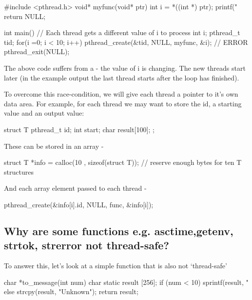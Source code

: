 \begin{code}[language=C]
#include <pthread.h>
void* myfunc(void* ptr) {
    int i = *((int *) ptr);
    printf("%
    return NULL;
}

int main() {
    // Each thread gets a different value of i to process
    int i;
    pthread_t tid;
    for(i =0; i < 10; i++) {
        pthread_create(&tid, NULL, myfunc, &i); // ERROR
    }
    pthread_exit(NULL);
}
\end{code}

The above code suffers from a  - the value of i is changing. The new threads start later (in the example output the last thread starts after the loop has finished).

To overcome this race-condition, we will give each thread a pointer to it's own data area. For example, for each thread we may want to store the id, a starting value and an output value:

\begin{code}[language=C]
struct T {
  pthread_t id;
  int start;
  char result[100];
};
\end{code}

These can be stored in an array -

\begin{code}
struct T *info = calloc(10 , sizeof(struct T)); // reserve enough bytes for ten T structures
\end{code}

And each array element passed to each thread -

\begin{code}
pthread_create(&info[i].id, NULL, func, &info[i]);
\end{code}

\subsection{Why are some functions e.g. asctime,getenv, strtok, strerror not thread-safe?}\label{why-are-some-functions-e.g.-asctimegetenv-strtok-strerror-not-thread-safe}

To answer this, let's look at a simple function that is also not `thread-safe'

\begin{code}[language=C]
char *to_message(int num) {
    char static result [256];
    if (num < 10) sprintf(result, "%
    else strcpy(result, "Unknown");
    return result;
}
\end{code}


